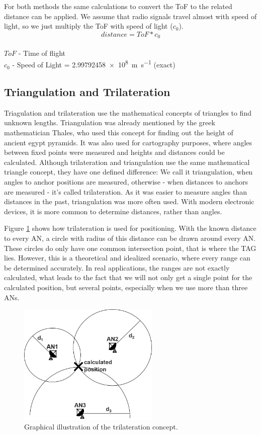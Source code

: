 For both methods the same calculations to convert the ToF to the related distance can be applied. We assume that radio signals travel almost with speed of light, so we just multiply the ToF with speed of light ($c_{0}$).
$$ distance = ToF * c_{0} $$\\
$ToF$ - Time of flight\\
$c_{0}$ - Speed of Light = \SI{2.99792458e8}{\meter\per\second} (exact) \\

\subsection{Triangulation and Trilateration}
Triagulation and trilateration use the mathematical concepts of triangles to find unknown lengths. Triangulation was already mentioned by the greek mathematician Thales, who used this concept for finding out the height of ancient egypt pyramids. \cite{thales} It was also used for cartography purposes, where angles between fixed points were measured and heights and distances could be calculated. 
Although trilateration and triangulation use the same mathematical triangle concept, they have one defined difference: We call it triangulation, when angles to anchor positions are measured, otherwise - when distances to anchors are measured - it's called trilateration.
As it was easier to measure angles than distances in the past, triangulation was more often used. With modern electronic devices, it is more common to determine distances, rather than angles. 

Figure \ref{fig:trilateration} shows how trilateration is used for positioning. With the known distance to every AN, a circle with radius of this distance can be drawn around every AN. These circles do only have one common intersection point, that is where the TAG lies. However, this is a theoretical and idealized scenario, where every range can be determined accurately. In real applications, the ranges are not exactly calculated, what leads to the fact that we will not only get a single point for the calculated position, but several points, especially when we use more than three ANs.

\begin{figure}[th]
\centering
\includegraphics[width=0.6\textwidth]{Figures/trilateration}
\decoRule
\caption[Trilateration]{Graphical illustration of the trilateration concept.}
\label{fig:trilateration}
\end{figure}

